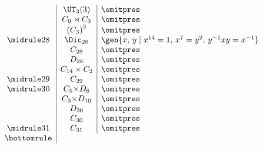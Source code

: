 \begin{displaymath}
\begin{array}{c|c|l}
   & \UT_3(3) & {\omitpres} \\
   & C_9 \rtimes C_3 & {\omitpres} \\
   & {(C_3)}^3 & {\omitpres} \\
\midrule
28 & \Dic_{28} & \gen{x,\,y \mid x^{14} = 1,\, x^7 = y^2,\, y^{-1}xy = x^{-1}} \\
   & C_{28} & {\omitpres} \\
   & D_{28} & {\omitpres} \\
   & C_{14} \times C_2 & {\omitpres} \\
\midrule
29 & C_{29} & {\omitpres} \\
\midrule
30 & C_5 {\times} D_6 & {\omitpres} \\
   & C_3 {\times} D_{10} & {\omitpres} \\
   & D_{30} & {\omitpres} \\
   & C_{30} & {\omitpres}\\
\midrule
31 & C_{31} & {\omitpres} \\
\bottomrule
\end{array}
\end{displaymath}
\vfill



